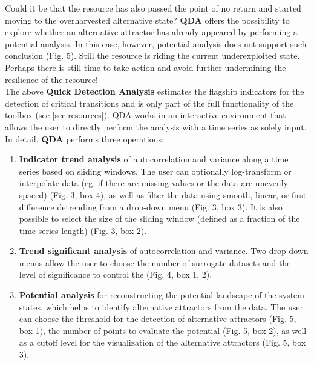 \documentclass[12pt,a4paper,final]{article}
\begin{document}
\begin{doublespacing}
Could it be that the resource has also passed the point of no return and started moving to the overharvested alternative state? \textbf{QDA} offers the possibility to explore whether an alternative attractor has already appeared by performing a potential analysis. In this case, however, potential analysis does not support such conclusion (Fig. 5). Still the resource is riding the current underexploited state. Perhaps there is still time to take action and avoid further undermining the resilience of the resource!\\


The above \textbf{Quick Detection Analysis} estimates the flagship indicators for the detection of critical transitions and is only part of the full functionality of the toolbox (see \ref{sec:resources}). QDA works in an interactive environment that allows the user to directly perform the analysis with a time series as solely input.
In detail, \textbf{QDA} performs three operations:
\begin{enumerate}
\item \textbf{Indicator trend analysis} of autocorrelation and variance along a time series based on sliding windows. The user can optionally log-transform or interpolate data (eg. if there are missing values or the data are unevenly spaced) (Fig. 3, box 4), as well as filter the data using smooth, linear, or first-difference detrending from a drop-down menu (Fig. 3, box 3). It is also possible to select the size of the sliding window (defined as a fraction of the time series length) (Fig. 3, box 2).
\item \textbf{Trend significant analysis} of autocorrelation and variance. Two drop-down menus allow the user to choose the number of surrogate datasets and the level of significance to control the  (Fig. 4, box 1, 2). 
\item \textbf{Potential analysis} for reconstructing the potential landscape of the system states, which helps to identify alternative attractors from the data. The user can choose the threshold for the detection of alternative attractors (Fig. 5, box 1), the number of points to evaluate the potential (Fig. 5, box 2), as well as a cutoff level for the visualization of the alternative attractors (Fig. 5, box 3).
\end{enumerate}


\end{doublespacing}
\end{document}
